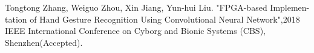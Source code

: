 
\begin{publication}
Tongtong Zhang, Weiguo Zhou, Xin Jiang, Yun-hui Liu. "FPGA-based Implemen-tation of Hand Gesture Recognition Using Convolutional Neural Network",2018 IEEE International Conference on Cyborg and Bionic Systems (CBS), Shenzhen(Accepted).



\end{publication}
